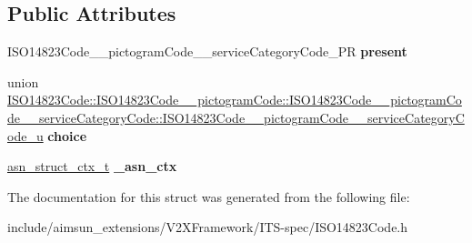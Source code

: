 \subsection*{Public Attributes}
\begin{DoxyCompactItemize}
\item 
I\+S\+O14823\+Code\+\_\+\+\_\+pictogram\+Code\+\_\+\+\_\+service\+Category\+Code\+\_\+\+PR {\bfseries present}\hypertarget{structISO14823Code_1_1ISO14823Code____pictogramCode_1_1ISO14823Code____pictogramCode____serviceCategoryCode_ab8292db98721a1524a6fdca80458829b}{}\label{structISO14823Code_1_1ISO14823Code____pictogramCode_1_1ISO14823Code____pictogramCode____serviceCategoryCode_ab8292db98721a1524a6fdca80458829b}

\item 
union \hyperlink{unionISO14823Code_1_1ISO14823Code____pictogramCode_1_1ISO14823Code____pictogramCode____serviceCae55999a37109a17de215317f84c86695}{I\+S\+O14823\+Code\+::\+I\+S\+O14823\+Code\+\_\+\+\_\+pictogram\+Code\+::\+I\+S\+O14823\+Code\+\_\+\+\_\+pictogram\+Code\+\_\+\+\_\+service\+Category\+Code\+::\+I\+S\+O14823\+Code\+\_\+\+\_\+pictogram\+Code\+\_\+\+\_\+service\+Category\+Code\+\_\+u} {\bfseries choice}\hypertarget{structISO14823Code_1_1ISO14823Code____pictogramCode_1_1ISO14823Code____pictogramCode____serviceCategoryCode_a00eba3054f57e7eed6926469b4cda9ff}{}\label{structISO14823Code_1_1ISO14823Code____pictogramCode_1_1ISO14823Code____pictogramCode____serviceCategoryCode_a00eba3054f57e7eed6926469b4cda9ff}

\item 
\hyperlink{structasn__struct__ctx__s}{asn\+\_\+struct\+\_\+ctx\+\_\+t} {\bfseries \+\_\+asn\+\_\+ctx}\hypertarget{structISO14823Code_1_1ISO14823Code____pictogramCode_1_1ISO14823Code____pictogramCode____serviceCategoryCode_a3c1628602322ddc6b76686425e2ba99f}{}\label{structISO14823Code_1_1ISO14823Code____pictogramCode_1_1ISO14823Code____pictogramCode____serviceCategoryCode_a3c1628602322ddc6b76686425e2ba99f}

\end{DoxyCompactItemize}


The documentation for this struct was generated from the following file\+:\begin{DoxyCompactItemize}
\item 
include/aimsun\+\_\+extensions/\+V2\+X\+Framework/\+I\+T\+S-\/spec/I\+S\+O14823\+Code.\+h\end{DoxyCompactItemize}
